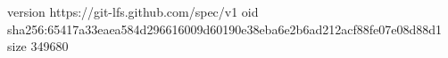 version https://git-lfs.github.com/spec/v1
oid sha256:65417a33eaea584d296616009d60190e38eba6e2b6ad212acf88fe07e08d88d1
size 349680
